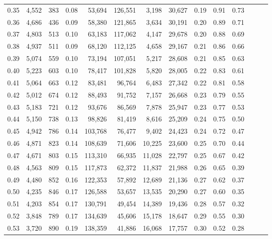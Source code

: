 \begin{tabular}{rrrrrrrrrrrrrr}
0.35 &  4,552 &  383 &  0.08 &   53,694 &  126,551 &   3,198 &  30,627 &  0.19 &  0.91 &      0.73 \\
0.36 &  4,686 &  436 &  0.09 &   58,380 &  121,865 &   3,634 &  30,191 &  0.20 &  0.89 &      0.71 \\
0.37 &  4,803 &  513 &  0.10 &   63,183 &  117,062 &   4,147 &  29,678 &  0.20 &  0.88 &      0.69 \\
0.38 &  4,937 &  511 &  0.09 &   68,120 &  112,125 &   4,658 &  29,167 &  0.21 &  0.86 &      0.66 \\
0.39 &  5,074 &  559 &  0.10 &   73,194 &  107,051 &   5,217 &  28,608 &  0.21 &  0.85 &      0.63 \\
0.40 &  5,223 &  603 &  0.10 &   78,417 &  101,828 &   5,820 &  28,005 &  0.22 &  0.83 &      0.61 \\
0.41 &  5,064 &  663 &  0.12 &   83,481 &   96,764 &   6,483 &  27,342 &  0.22 &  0.81 &      0.58 \\
0.42 &  5,012 &  674 &  0.12 &   88,493 &   91,752 &   7,157 &  26,668 &  0.23 &  0.79 &      0.55 \\
0.43 &  5,183 &  721 &  0.12 &   93,676 &   86,569 &   7,878 &  25,947 &  0.23 &  0.77 &      0.53 \\
0.44 &  5,150 &  738 &  0.13 &   98,826 &   81,419 &   8,616 &  25,209 &  0.24 &  0.75 &      0.50 \\
0.45 &  4,942 &  786 &  0.14 &  103,768 &   76,477 &   9,402 &  24,423 &  0.24 &  0.72 &      0.47 \\
0.46 &  4,871 &  823 &  0.14 &  108,639 &   71,606 &  10,225 &  23,600 &  0.25 &  0.70 &      0.44 \\
0.47 &  4,671 &  803 &  0.15 &  113,310 &   66,935 &  11,028 &  22,797 &  0.25 &  0.67 &      0.42 \\
0.48 &  4,563 &  809 &  0.15 &  117,873 &   62,372 &  11,837 &  21,988 &  0.26 &  0.65 &      0.39 \\
0.49 &  4,480 &  852 &  0.16 &  122,353 &   57,892 &  12,689 &  21,136 &  0.27 &  0.62 &      0.37 \\
0.50 &  4,235 &  846 &  0.17 &  126,588 &   53,657 &  13,535 &  20,290 &  0.27 &  0.60 &      0.35 \\
0.51 &  4,203 &  854 &  0.17 &  130,791 &   49,454 &  14,389 &  19,436 &  0.28 &  0.57 &      0.32 \\
0.52 &  3,848 &  789 &  0.17 &  134,639 &   45,606 &  15,178 &  18,647 &  0.29 &  0.55 &      0.30 \\
0.53 &  3,720 &  890 &  0.19 &  138,359 &   41,886 &  16,068 &  17,757 &  0.30 &  0.52 &      0.28 \\

\end{tabular}
